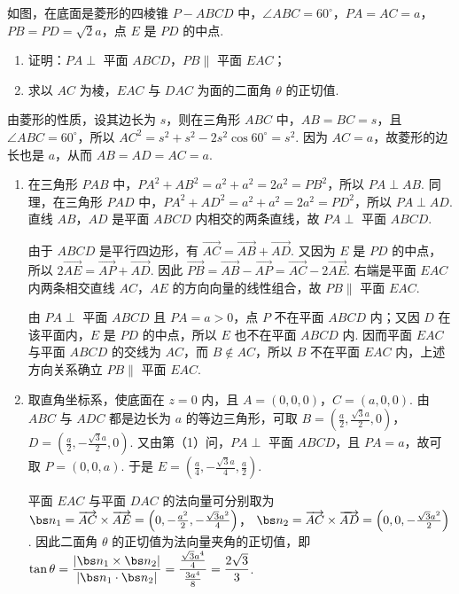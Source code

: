 \begin{problem}
如图，在底面是菱形的四棱锥 \(P-ABCD\) 中，\(\angle ABC = 60^{\circ}\)，\(PA = AC = a\)，\(PB = PD = \sqrt{2}a\)，点 \(E\) 是 \(PD\) 的中点.

\begin{enumerate}
\item 证明：\(PA \perp\) 平面 \(ABCD\)，\(PB \parallel\) 平面 \(EAC\)；
\item 求以 \(AC\) 为棱，\(EAC\) 与 \(DAC\) 为面的二面角 \(\theta\) 的正切值.
\end{enumerate}

\end{problem}

\begin{solution}
由菱形的性质，设其边长为 \(s\)，则在三角形 \(ABC\) 中，\(AB=BC=s\)，且 \(\angle ABC=60^{\circ}\)，所以
\(AC^2=s^2+s^2-2s^2\cos60^{\circ}=s^2\). 因为 \(AC=a\)，故菱形的边长也是 \(a\)，从而 \(AB=AD=AC=a\).

\begin{enumerate}
\item 在三角形 \(PAB\) 中，\(PA^2+AB^2=a^2+a^2=2a^2=PB^2\)，所以 \(PA\perp AB\). 同理，在三角形 \(PAD\) 中，\(PA^2+AD^2=a^2+a^2=2a^2=PD^2\)，所以 \(PA\perp AD\). 直线 \(AB\)，\(AD\) 是平面 \(ABCD\) 内相交的两条直线，故 \(PA\perp\) 平面 \(ABCD\).

由于 \(ABCD\) 是平行四边形，有 \(\overrightarrow{AC}=\overrightarrow{AB}+\overrightarrow{AD}\). 又因为 \(E\) 是 \(PD\) 的中点，所以 \(2\overrightarrow{AE}=\overrightarrow{AP}+\overrightarrow{AD}\). 因此
\(\overrightarrow{PB}=\overrightarrow{AB}-\overrightarrow{AP}=\overrightarrow{AC}-2\overrightarrow{AE}\). 右端是平面 \(EAC\) 内两条相交直线 \(AC\)，\(AE\) 的方向向量的线性组合，故 \(PB\parallel\) 平面 \(EAC\).

由 \(PA\perp\) 平面 \(ABCD\) 且 \(PA=a>0\)，点 \(P\) 不在平面 \(ABCD\) 内；又因 \(D\) 在该平面内，\(E\) 是 \(PD\) 的中点，所以 \(E\) 也不在平面 \(ABCD\) 内. 因而平面 \(EAC\) 与平面 \(ABCD\) 的交线为 \(AC\)，而 \(B\notin AC\)，所以 \(B\) 不在平面 \(EAC\) 内，上述方向关系确立 \(PB\parallel\) 平面 \(EAC\).

\item 取直角坐标系，使底面在 \(z=0\) 内，且 \(A=(0,0,0)\)，\(C=(a,0,0)\). 由 \(ABC\) 与 \(ADC\) 都是边长为 \(a\) 的等边三角形，可取
\(B=\left(\frac{a}{2},\frac{\sqrt{3}a}{2},0\right)\)，\(D=\left(\frac{a}{2},-\frac{\sqrt{3}a}{2},0\right)\). 又由第（1）问，\(PA\perp\) 平面 \(ABCD\)，且 \(PA=a\)，故可取 \(P=(0,0,a)\). 于是
\(E=\left(\frac{a}{4},-\frac{\sqrt{3}a}{4},\frac{a}{2}\right)\).

平面 \(EAC\) 与平面 \(DAC\) 的法向量可分别取为
\(\bs n_1=\overrightarrow{AC}\times\overrightarrow{AE}=\left(0,-\frac{a^2}{2},-\frac{\sqrt{3}a^2}{4}\right)\)，
\(\bs n_2=\overrightarrow{AC}\times\overrightarrow{AD}=\left(0,0,-\frac{\sqrt{3}a^2}{2}\right)\).
因此二面角 \(\theta\) 的正切值为法向量夹角的正切值，即
\(\displaystyle\tan\theta=\frac{|\bs n_1\times\bs n_2|}{|\bs n_1\cdot\bs n_2|}=\frac{\frac{\sqrt{3}a^4}{4}}{\frac{3a^4}{8}}=\frac{2\sqrt{3}}{3}\).
\end{enumerate}
\end{solution}

